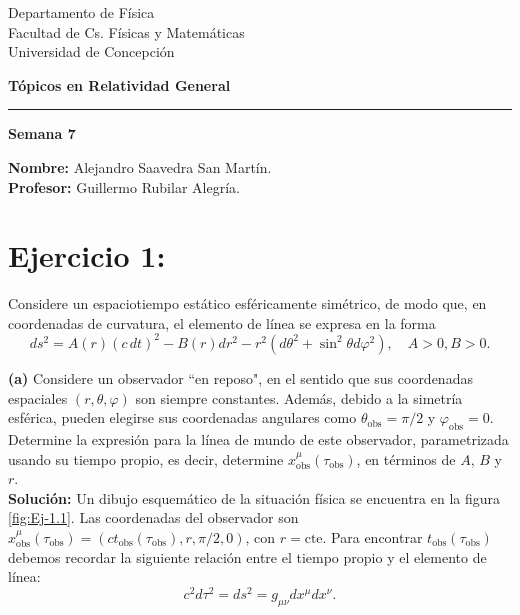 \documentclass[letterpaper,11pt]{article}
\begin{document}
\pagestyle{plain}

\begin{flushleft}\vspace{-2cm}
Departamento de Física \\
Facultad de Cs. Físicas y Matemáticas\\
Universidad de Concepción
\end{flushleft}

\begin{flushright}\vspace{-1.5cm}
\textbf{Tópicos en Relatividad General} 
\end{flushright}



\rule{\linewidth}{0.1mm}

\begin{center}
\textbf{\LARGE Semana 7}
\end{center}

\begin{flushleft}
\textbf{Nombre:} Alejandro Saavedra San Martín. \\
\textbf{Profesor:} Guillermo Rubilar Alegría.
\end{flushleft}

\section*{Ejercicio 1:}

Considere un espaciotiempo estático esféricamente simétrico, de modo que, en coordenadas de curvatura, el elemento de línea se expresa en la forma
\begin{equation}
ds^2 = A(r) (c \, dt)^2 - B(r) dr^2 - r^2(d\theta^2 + \sin^2\theta d\varphi^2), \quad A > 0, B > 0. \label{eq:ej-1-metric}
\end{equation}


\textbf{(a)} Considere un observador ``en reposo", en el sentido que sus coordenadas espaciales $(r,\theta,\varphi)$ son siempre constantes. Además, debido a la simetría esférica, pueden elegirse sus coordenadas angulares como $\theta_{\text{obs}} = \pi/2$ y $\varphi_{\text{obs}} = 0$. Determine la expresión para la línea de mundo de este observador, parametrizada usando su tiempo propio, es decir, determine $x_{\text{obs}}^{\mu}(\tau_{\text{obs}})$, en términos de $A$, $B$ y $r$.
\\

\textbf{Solución:} Un dibujo esquemático de la situación física se encuentra en la figura \ref{fig:Ej-1.1}. Las coordenadas del observador son $x_{\text{obs}}^{\mu}(\tau_{\text{obs}}) = (c t_{\text{obs}}(\tau_{\text{obs}}),r,\pi/2,0)$, con $r = \text{cte}$. Para encontrar $t_{\text{obs}}(\tau_{\text{obs}})$ debemos recordar la siguiente relación entre el tiempo propio y el elemento de línea:
\begin{equation}
c^2 d\tau^2 = ds^2 = g_{\mu\nu} dx^{\mu} dx^{\nu}.
\end{equation}
\end{document}
